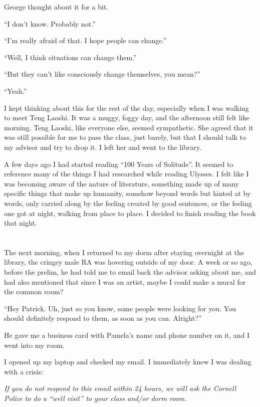 George thought about it for a bit.

``I don't know.  Probably not.''

``I'm really afraid of that.  I hope people can change.''

``Well, I think situations can change them.''

``But they can't like consciously change themselves, you mean?''

``Yeah.''

I kept thinking about this for the rest of the day, especially when I was
walking to meet Teng Laoshi.  It was a muggy, foggy day, and the afternoon still
felt like morning.  Teng Laoshi, like everyone else, seemed sympathetic.  She
agreed that it was still possible for me to pass the class, just barely, but
that I should talk to my advisor and try to drop it.  I left her and went to the
library.

A few days ago I had started reading ``100 Years of Solitude''.  It seemed to
reference many of the things I had researched while reading Ulysses.  I felt
like I was becoming aware of the nature of literature, something made up of many
specific things that make up humanity, somehow beyond words but hinted at by
words, only carried along by the feeling created by good sentences, or the
feeling one got at night, walking from place to place.  I decided to finish
reading the book that night.

\section{}

The next morning, when I returned to my dorm after staying overnight at the
library, the cringey male RA was hovering outside of my door.  A week or so ago,
before the prelim, he had told me to email back the advisor asking about me, and
had also mentioned that since I was an artist, maybe I could make a mural for
the common room?

``Hey Patrick.  Uh, just so you know, some people were looking for you.  You
should definitely respond to them, as soon as you can.  Alright?''

He gave me a business card with Pamela's name and phone number on it, and I went
into my room.

I opened up my laptop and checked my email.  I immediately knew I was dealing
with a crisis: 

\textit{If you do not respond to this email within 24 hours, we will ask
the Cornell Police to do a ``well visit'' to your class and/or dorm room.}

